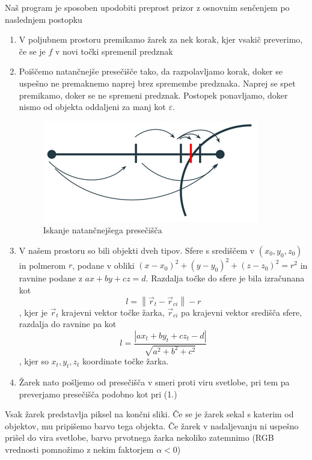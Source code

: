 \documentclass[titlepage]{article}
\begin{document}
Naš program je sposoben upodobiti preprost prizor z osnovnim senčenjem po naslednjem postopku
\newline
\bigskip
\begin{enumerate}
\item V poljubnem prostoru premikamo žarek za nek korak, kjer vsakič preverimo, če se je $f$ v novi točki spremenil predznak
\item Poiščemo natančnejše presečišče tako, da razpolavljamo korak, doker se uspešno ne premaknemo naprej brez spremembe predznaka. Naprej se spet premikamo, doker se ne spremeni predznak. Postopek ponavljamo, doker nismo od objekta oddaljeni za manj kot $\varepsilon$.
\begin{figure}[H]
    \centering
    \includegraphics[width=0.5\linewidth]{intersect.png}
    \caption{Iskanje natančnejšega presečišča}
    \label{Slika:Iskanje natančnejšega presečišča}
\end{figure}
\item[] V našem prostoru so bili objekti dveh tipov. Sfere s središčem v $(x_{0}, y_{0}, z_{0})$ in polmerom $r$, podane v obliki $(x-x_{0})^{2}+(y-y_{0})^{2}+(z-z_{0})^{2}=r^{2}$ in ravnine podane z $ax+by+cz=d$. Razdalja točke do sfere je bila izračunana kot
\begin{equation} \label{e:distSphere}
    l=\left \| \vec{r}_{t}-\vec{r}_{ci} \right \| - r
\end{equation},
kjer je $\vec{r}_{t}$ krajevni vektor točke žarka, $\vec{r}_{ci}$ pa krajevni vektor središča sfere, razdalja do ravnine pa kot
\begin{equation} \label{e:distPlane}
    l=\frac{\left | ax_{t}+by_{t}+cz_{t}-d \right |}{\sqrt{a^{2}+b^{2}+c^{2}}}
\end{equation},
kjer so $x_{t}, y_{t}, z_{t}$ koordinate točke žarka.
\item Žarek nato pošljemo od presečišča v smeri proti viru svetlobe, pri tem pa preverjamo presečišča podobno kot pri (1.)
\end{enumerate}
Vsak žarek predstavlja piksel na končni sliki. Če se je žarek sekal s katerim od objektov, mu pripišemo barvo tega objekta. Če žarek v nadaljevanju ni uspešno prišel do vira svetlobe, barvo prvotnega žarka nekoliko zatemnimo (RGB vrednosti pomnožimo z nekim faktorjem $\alpha < 0$)
\end{document}
